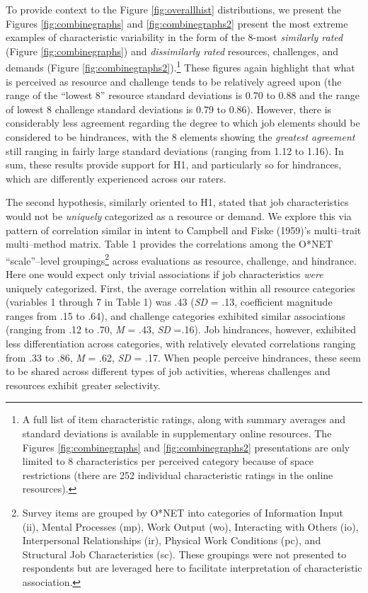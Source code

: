 \documentclass[
  man]{apa7}
\begin{document}
To provide context to the Figure \ref{fig:overallhist} distributions, we present the Figures \ref{fig:combinegraphs} and \ref{fig:combinegraphs2} present the most extreme examples of characteristic variability in the form of the 8-most \emph{similarly rated} (Figure \ref{fig:combinegraphs}) and \emph{dissimilarly rated} resources, challenges, and demands (Figure \ref{fig:combinegraphs2}).\footnote{A full list of item characteristic ratings, along with summary averages and standard deviations is available in supplementary online resources. The Figures \ref{fig:combinegraphs} and \ref{fig:combinegraphs2} presentations are only limited to 8 characteristics per perceived category because of space restrictions (there are 252 individual characteristic ratings in the online resources).} These figures again highlight that what is perceived as resource and challenge tends to be relatively agreed upon (the range of the ``lowest 8'' resource standard deviations is 0.70 to 0.88 and the range of lowest 8 challenge standard deviations is 0.79 to 0.86). However, there is considerably less agreement regarding the degree to which job elements should be considered to be hindrances, with the 8 elements showing the \emph{greatest agreement} still ranging in fairly large standard deviations (ranging from 1.12 to 1.16). In sum, these results provide support for H1, and particularly so for hindrances, which are differently experienced across our raters.

The second hypothesis, similarly oriented to H1, stated that job characteristics would not be \emph{uniquely} categorized as a resource or demand. We explore this via pattern of correlation similar in intent to Campbell and Fiske (1959)'s multi--trait multi--method matrix. Table 1 provides the correlations among the O*NET ``scale''--level groupings\footnote{Survey items are grouped by O*NET into categories of Information Input (ii), Mental Processes (mp), Work Output (wo), Interacting with Others (io), Interpersonal Relationships (ir), Physical Work Conditions (pc), and Structural Job Characteristics (sc). These groupings were not presented to respondents but are leveraged here to facilitate interpretation of characteristic association.} across evaluations as resource, challenge, and hindrance. Here one would expect only trivial associations if job characteristics \emph{were} uniquely categorized. First, the average correlation within all resource categories (variables 1 through 7 in Table 1) was .43 (\emph{SD} = .13, coefficient magnitude ranges from .15 to .64), and challenge categories exhibited similar associations (ranging from .12 to .70, \emph{M} = .43, \emph{SD} =.16). Job hindrances, however, exhibited less differentiation across categories, with relatively elevated correlations ranging from .33 to .86, \emph{M} = .62, \emph{SD} = .17. When people perceive hindrances, these seem to be shared across different types of job activities, whereas challenges and resources exhibit greater selectivity.
\end{document}
